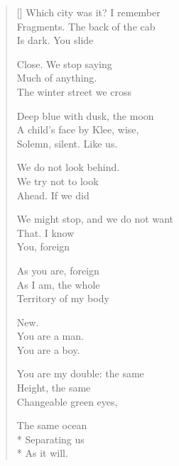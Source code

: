 \label{ch:northampton}
\settowidth{\versewidth}{We might stop, and we do not want}
\begin{verse}[\versewidth]
Which city was it? I remember\\
Fragments. The back of the cab\\
Is dark. You slide

Close. We stop saying\\
Much of anything.\\
The winter street we cross

Deep blue with dusk, the moon\\
A child's face by Klee, wise,\\
Solemn, silent. Like us.

We do not look behind.\\
We try not to look\\
Ahead. If we did

We might stop, and we do not want\\
That. I know\\
You, foreign

As you are, foreign\\
As I am, the whole\\
Territory of my body

New.\\
You are a man.\\
You are a boy.

You are my double: the same\\
Height, the same\\
Changeable green eyes,

The same ocean\\*
Separating us\\*
As it will.
\end{verse}
